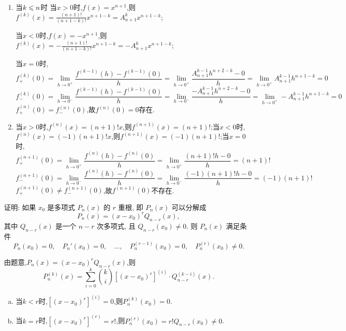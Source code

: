 \begin{solution}
    \begin{enumerate}
        \item 当$k\leqslant n$时
        当$x>0$时,$f(x) = x^{n+1}$,则$f^{(k)}(x) = \frac{(n+1)!}{(n+1-k)!} x^{n+1-k}=A^{k}_{n+1} x^{n+1-k}$;
        
        当$x<0$时,$f(x) = -x^{n+1}$,则$f^{(k)}(x) = -\frac{(n+1)!}{(n+1-k)!} x^{n+1-k}=-A^{k}_{n+1} x^{n+1-k}$;
        
        当$x=0$时,
              $$f_+^{(k)}(0) = \lim_{h \to 0^+} \frac{f^{(k-1)}(h) - f^{(k-1)}(0)}{h} = \lim_{h \to 0^+} \frac{A^{k-1}_{n+1} h^{n+2-k} - 0}{h} = \lim_{h \to 0^+}A^{k-1}_{n+1} h^{n+1-k}  =0 $$
              $$f_-^{(k)}(0) = \lim_{h \to 0^-} \frac{f^{(k-1)}(h) - f^{(k-1)}(0)}{h} = \lim_{h \to 0^-} \frac{ -A^{k-1}_{n+1} h^{n+2-k} - 0}{h}  = \lim_{h \to 0^+}-A^{k-1}_{n+1} h^{n+1-k}  =0$$
              $f_+^{(n)}(0) = f_-^{(n)}(0)$,故$f^{(n)}(0) = 0$存在.
        \item 当$x>0$时,$f^{(n)}(x) = (n+1)! x$,则$f^{(n+1)}(x) = (n+1)!$;当$x<0$时,$f^{(n)}(x) = (-1) (n+1)! x$,则$f^{(n+1)}(x) = (-1) (n+1)!$;当$x=0$时,
              $$f_+^{(n+1)}(0) = \lim_{h \to 0^+} \frac{f^{(n)}(h) - f^{(n)}(0)}{h} = \lim_{h \to 0^+} \frac{(n+1)! h - 0}{h} = (n+1)! $$
              $$f_-^{(n+1)}(0) = \lim_{h \to 0^-} \frac{f^{(n)}(h) - f^{(n)}(0)}{h} = \lim_{h \to 0^-} \frac{(-1) (n+1)! h - 0}{h} = (-1) (n+1)! $$
              $f_+^{(n+1)}(0) \neq f_-^{(n+1)}(0)$,故$f^{(n+1)}(0)$不存在.
    \end{enumerate}
\end{solution}

\begin{exercise}[3.1.21]
    证明: 如果 $x_0$ 是多项式 $P_n(x)$ 的 $r$ 重根, 即 $P_n(x)$ 可以分解成
    $$ P_n(x) = (x-x_0)^r Q_{n-r}(x), $$
    其中 $Q_{n-r}(x)$ 是一个 $n-r$ 次多项式, 且 $Q_{n-r}(x_0) \ne 0$. 则 $P_n(x)$ 满足条件
    $$ P_n(x_0)=0, \quad P_n'(x_0)=0, \quad \dots, \quad P_n^{(r-1)}(x_0)=0, \quad P_n^{(r)}(x_0) \ne 0. $$
\end{exercise}

\begin{solution}
    由题意,$P_n(x) = (x-x_0)^r Q_{n-r}(x)$,则
    $$P_n^{(k)}(x) = \sum_{i=0}^k \binom{k}{i} \left[ (x-x_0)^r \right]^{(i)} \cdot Q_{n-r}^{(k-i)}(x).$$
    \begin{enumerate}[(a)]
        \item 当$k < r$时,$\left[ (x-x_0)^r \right]^{(i)} = 0$,则$P_n^{(k)}(x_0) = 0$.
        \item 当$k = r$时,$\left[ (x-x_0)^r \right]^{(r)} = r!$,则$P_n^{(r)}(x_0) = r! Q_{n-r}(x_0) \neq 0$.
    \end{enumerate}

\end{solution}

